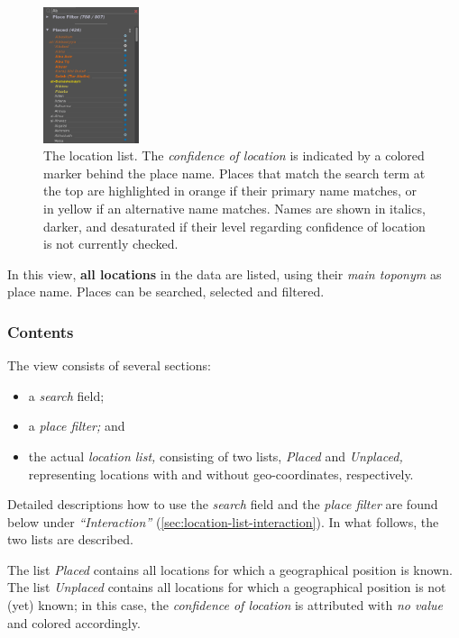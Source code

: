 \begin{figure}[tb]
  \centering
  \includegraphics[width=0.25\textwidth]{../src/assets/visualization-documentation/location-list-1.png}
  \caption{
    The location list.
    The \emph{confidence of location} is indicated by a colored marker behind the place name.
    Places that match the search term at the top are highlighted in orange if their primary name matches, or in yellow if an alternative name matches.
    Names are shown in italics, darker, and desaturated if their level regarding confidence of location is not currently checked.
  }
  \label{fig:location-list-1}
\end{figure}

In this view, \textbf{all locations} in the data are listed, using their \emph{main toponym} as place name.
Places can be searched, selected and filtered.


\subsubsection{Contents}
\label{sec:location-list-contents}

The view consists of several sections:

\begin{itemize}
  \item a \emph{search} field;
  \item a \emph{place filter;} and
  \item the actual \emph{location list,} consisting of two lists, \emph{Placed} and \emph{Unplaced,} representing locations with and without geo-coordinates, respectively.
\end{itemize}

Detailed descriptions how to use the \emph{search} field and the \emph{place filter} are found below under \emph{\enquote{Interaction}} (\cref{sec:location-list-interaction}).
In what follows, the two lists are described.

\label{sec:location-list-unplaced}
The list \emph{Placed} contains all locations for which a geographical position is known.
The list \emph{Unplaced} contains all locations for which a geographical position is not (yet) known;
in this case, the \emph{confidence of location} is attributed with \emph{no value} and colored accordingly.

